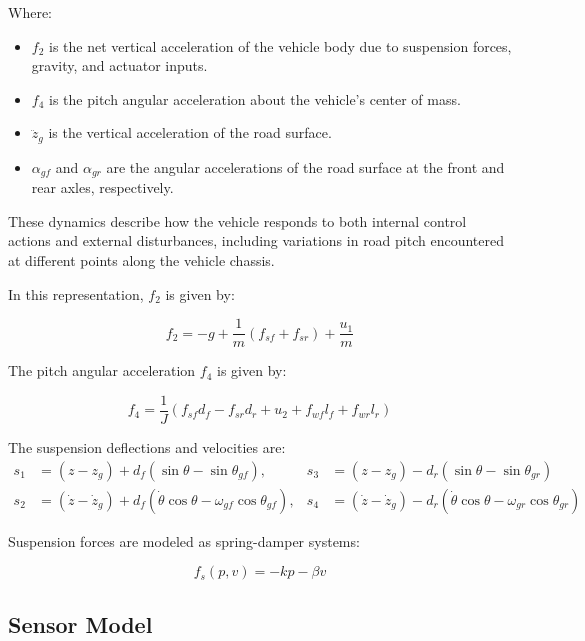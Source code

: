 \documentclass[]{report}
\begin{document}
	Where:
	\begin{itemize}
		\item $f_2$ is the net vertical acceleration of the vehicle body due to suspension forces, gravity, and actuator inputs.
		\item $f_4$ is the pitch angular acceleration about the vehicle’s center of mass.
		\item $\ddot{z}_g$ is the vertical acceleration of the road surface.
		\item $\alpha_{gf}$ and $\alpha_{gr}$ are the angular accelerations of the road surface at the front and rear axles, respectively.
	\end{itemize}
	
	These dynamics describe how the vehicle responds to both internal control actions and external disturbances, including variations in road pitch encountered at different points along the vehicle chassis.
	
	In this representation, $f_2$ is given by:
	
	
		\begin{equation}
			f_2 = -g + \frac{1}{m}(f_{sf} + f_{sr}) + \frac{u_1}{m} 
		\end{equation}
	\vspace{0.2mm}
	
	The pitch angular acceleration $f_4$ is given by:
	
	\begin{equation}	
		f_4 = \frac{1}{J}(f_{sf} d_f - f_{sr} d_r + u_2 + f_{wf} l_{f} + f_{wr} l_{r})
	\end{equation}
	\vspace{0.2mm}
	
	The suspension deflections and velocities are:
\begin{align}	
	s_1 &= (z - z_g) + d_f(\sin\theta - \sin\theta_{gf}), &
	s_3 &= (z - z_g) - d_r(\sin\theta - \sin\theta_{gr}) \\[4pt]
	s_2 &= (\dot{z} - \dot{z}_g) + d_f(\dot{\theta} \cos\theta - \omega_{gf} \cos\theta_{gf}), &
	s_4 &= (\dot{z} - \dot{z}_g) - d_r(\dot{\theta} \cos\theta - \omega_{gr} \cos\theta_{gr})
\end{align}

	
	Suspension forces are modeled as spring-damper systems:
	
	\begin{equation}
		f_s(p, v) = -k p - \beta v
	\end{equation}
	
	\subsection{Sensor Model}
	
\end{document}
